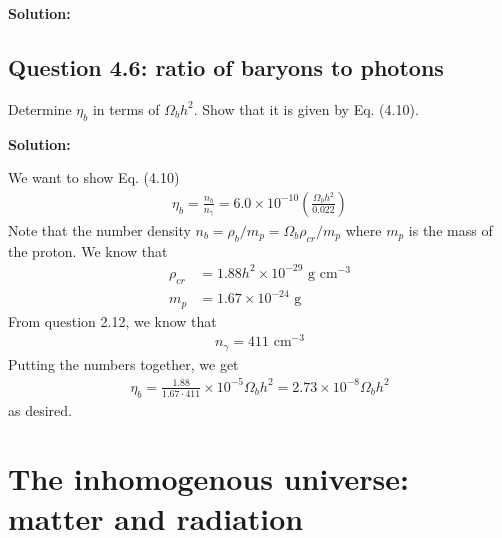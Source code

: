 \documentclass[11pt]{article}
\begin{document}
\textbf{Solution:}

\subsection{Question 4.6: ratio of baryons to photons}
Determine $\eta_b$ in terms of $\Omega_b h^2$. Show that it is given by Eq. (4.10).

\textbf{Solution:}

We want to show Eq. (4.10) 
\begin{align*}
    \eta_b = \frac{n_b}{n_\gamma} = 6.0 \times 10^{-10} \left( \frac{\Omega_bh^2}{0.022}\right) 
\end{align*}
Note that the number density $n_b = \rho_b / m_p = \Omega_b \rho_{cr} / m_p$ where $m_p$ is the mass of the proton. We know that 
\begin{align*}
    \rho_{cr} &= 1.88 h^2 \times 10^{-29} \text{ g cm}^{-3} \\
    m_p &= 1.67 \times 10^{-24} \text{ g}
\end{align*}
From question 2.12, we know that
\begin{align*}
    n_\gamma = 411 \text{ cm}^{-3}
\end{align*}
Putting the numbers together, we get
\begin{align*}
    \eta_b = \frac{1.88}{1.67 \cdot 411} \times 10^{-5} \Omega_b h^2 = 2.73 \times 10^{-8} \Omega_b h^2 
\end{align*}
as desired. 

\newpage 
\section{The inhomogenous universe: matter and radiation}
\end{document}
